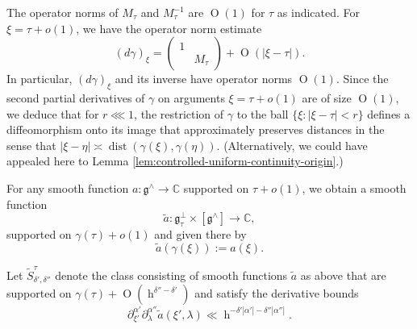 \documentclass[reqno]{amsart}
\DeclareMathOperator{\h}{h}
\DeclareMathOperator{\dist}{dist}
\def\O{\operatorname{O}}
\theoremstyle{plain} \newtheorem{theorem} {Theorem}
\theoremstyle{definition} \newtheorem{definition} [theorem] {Definition}
\theoremstyle{itplain} %
\numberwithin{equation}{section}
\numberwithin{theorem}{section}
\begin{document}
The operator norms of $M_\tau$ and $M_\tau^{-1}$ are $\O(1)$ for $\tau$ as indicated.  For $\xi = \tau + o(1)$, we have the operator norm estimate
\begin{equation}\label{eqn:estimate-d-gamma-xi-near-tau}
  (d \gamma)_{\xi}
  = \left(
    \begin{smallmatrix}
      1&\\
      &M_\tau
    \end{smallmatrix}
  \right) + \O(|\xi - \tau|).
\end{equation}
In particular, $(d \gamma)_{\xi}$ and its inverse have operator norms $\O(1)$.  Since the second partial derivatives of $\gamma$ on arguments $\xi = \tau + o(1)$ are of size $\O(1)$, we deduce that for $r \lll 1$, the restriction of $\gamma$ to the ball $\{\xi : |\xi - \tau| < r\}$ defines a diffeomorphism onto its image that approximately preserves distances in the sense that $|\xi-\eta| \asymp \dist(\gamma(\xi), \gamma(\eta))$.  (Alternatively, we could have appealed here to Lemma \ref{lem:controlled-uniform-continuity-origin}.)

For any smooth function $a : \mathfrak{g}^\wedge \rightarrow \mathbb{C}$ supported on $\tau + o(1)$, we obtain a smooth function
\[
  \tilde{a} : \mathfrak{g}_\tau^\perp \times [\mathfrak{g}^\wedge] \rightarrow \mathbb{C},
\]
supported on $\gamma(\tau) + o(1)$ and given there by
\begin{equation}\label{eq:tild-:=-axi}
  \tilde{a}(\gamma(\xi)) := a(\xi).
\end{equation}

Let $\tilde{S}^{\tau}_{\delta ', \delta ''}$ denote the class consisting of smooth functions $\tilde{a}$ as above that are supported on $\gamma(\tau) + \O(\h^{ \delta '' - \delta'})$ and satisfy the derivative bounds
\begin{equation}\label{eqn:tilde-a-deriv-bounds}
  \partial_{\xi '}^{\alpha'}
  \partial_{\lambda}^{\alpha ''}
  \tilde{a}(\xi ', \lambda )
  \ll
  \h^{- \delta ' |\alpha '|
    - \delta ''| \alpha ''|}.
\end{equation}
\end{document}
